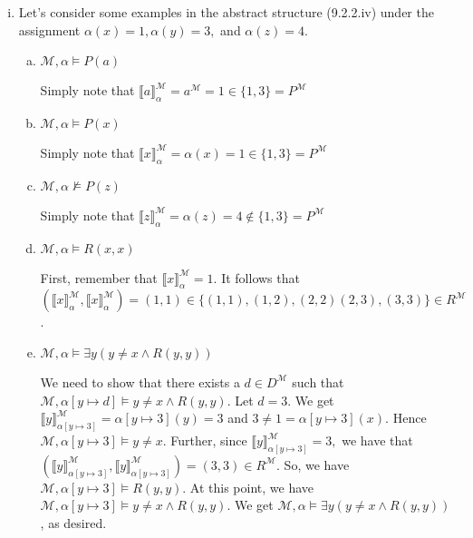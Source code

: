 \begin{enumerate}[\thesection.1]
\begin{enumerate}[(i)]
\begin{enumerate}[(a)]
			\end{enumerate}
			
			\item Let's consider some examples in the abstract structure (9.2.2.iv) under the assignment $\alpha(x)=1, \alpha(y)=3, $ and $\alpha(z)=4$.
			
			\begin{enumerate}[(a)]
			
			\item $\mathcal{M},\alpha\vDash P(a)$
				
				Simply note that $\llbracket a\rrbracket^\mathcal{M}_\alpha=a^\mathcal{M}=1\in \{1,3\}=P^\mathcal{M}$
					
				\item $\mathcal{M},\alpha\vDash P(x)$
				
				Simply note that $\llbracket x\rrbracket^\mathcal{M}_\alpha=\alpha(x)=1\in \{1,3\}=P^\mathcal{M}$
				
				\item $\mathcal{M},\alpha\nvDash P(z)$
				
				Simply note that $\llbracket z\rrbracket^\mathcal{M}_\alpha=\alpha(z)=4\notin \{1,3\}=P^\mathcal{M}$
				
				
				\item $\mathcal{M},\alpha\vDash R(x,x)$
				
				First,  remember that $\llbracket x\rrbracket^\mathcal{M}_\alpha=1.$ It follows that $(\llbracket x\rrbracket^\mathcal{M}_\alpha,\llbracket x\rrbracket^\mathcal{M}_\alpha)=(1,1)\in\{(1,1), (1,2),(2,2) (2,3), (3,3)\}\in R^\mathcal{M}$.
				
				\item $\mathcal{M},\alpha\vDash \exists y (y\neq x\land R(y,y))$
				
				We need to show that there exists a $d\in D^\mathcal{M}$ such that $\mathcal{M},\alpha[y\mapsto d]\vDash y\neq x\land R(y,y)$. Let $d=3$. We get $\llbracket y\rrbracket^\mathcal{M}_{\alpha[y\mapsto 3]}=\alpha[y\mapsto 3](y)=3$  and $3\neq 1=\alpha[y\mapsto 3](x)$. Hence $\mathcal{M},\alpha[y\mapsto 3]\vDash y\neq x$. Further, since $\llbracket y\rrbracket^\mathcal{M}_{\alpha[y\mapsto 3]}=3,$ we have that $(\llbracket y\rrbracket^\mathcal{M}_{\alpha[y\mapsto 3]},\llbracket y\rrbracket^\mathcal{M}_{\alpha[y\mapsto 3]})=(3,3)\in R^\mathcal{M}$. So, we have $\mathcal{M},\alpha[y\mapsto 3]\vDash R(y,y)$. At this point, we have $\mathcal{M},\alpha[y\mapsto 3]\vDash y\neq x\land R(y,y)$. We get $\mathcal{M},\alpha\vDash \exists y (y\neq x\land R(y,y))$, as desired.
				

\end{enumerate}
\end{enumerate}
\end{enumerate}
